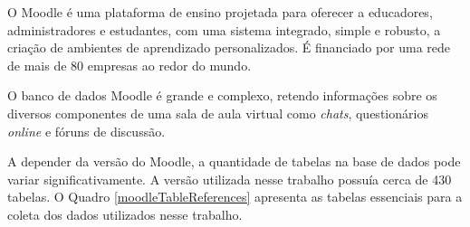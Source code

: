O Moodle é uma plataforma de ensino projetada para oferecer a educadores,
administradores e estudantes, com uma sistema integrado, simple e robusto, a
criação de ambientes de aprendizado personalizados. É financiado por uma rede de
mais de 80 empresas ao redor do mundo.

O banco de dados Moodle é grande e complexo, retendo informações sobre os
diversos componentes de uma sala de aula virtual como \textit{chats},
questionários \textit{online} e fóruns de discussão.

A depender da versão do Moodle, a quantidade de tabelas na base de dados pode
variar significativamente. A versão utilizada nesse trabalho possuía cerca de
430 tabelas. O Quadro \ref{moodleTableReferences} apresenta as tabelas
essenciais para a coleta dos dados utilizados nesse trabalho.

